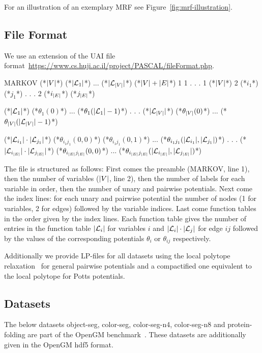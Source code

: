 For an illustration of an exemplary MRF see Figure~\ref{fig:mrf-illustration}.

\subsection{File Format}
\label{sec:mrf-file-format}
We use an extension of the UAI file format~\url{https://www.cs.huji.ac.il/project/PASCAL/fileFormat.php}.

{
\small
\begin{fileformat}
MARKOV
(*$\lvert V\rvert$*)
(*$\lvert\mathcal{L}_1\rvert$*) ... (*$\lvert\mathcal{L}_{\lvert V\rvert}\rvert$*) 
(*$\lvert V\rvert + \lvert E\rvert$*)
1 1
.
.
.
1 (*$\lvert V\rvert$*) 
2 (*$i_1$*) (*$j_1$*) 
.
.
.
2 (*$i_{\lvert E\rvert}$*) (*$j_{\lvert E\rvert}$*) 

(*$\lvert\mathcal{L}_1\rvert$*) 
(*$\theta_1(0)$*) ... (*$\theta_1(\lvert\mathcal{L}_1\rvert-1)$*)
.
.
.
(*$\lvert\mathcal{L}_{\lvert V\rvert}\rvert$*)
(*$\theta_{\lvert V\rvert}(0)$*) ... (*$\theta_{\lvert V\rvert}(\lvert\mathcal{L}_{\lvert V\rvert}\rvert-1)$*)

(*$\lvert\mathcal{L}_{i_1}\rvert \cdot \lvert\mathcal{L}_{j_1}\rvert $*) 
(*$\theta_{i_1 j_1}(0,0)$*) (*$\theta_{i_1 j_1}(0,1)$*) ... (*$\theta_{i_1 j_1}(\lvert\mathcal{L}_{i_1}\rvert, \lvert\mathcal{L}_{j_1}\rvert)$*)
.
.
.
(*$\lvert\mathcal{L}_{i_{\lvert E\rvert}}\rvert \cdot \lvert\mathcal{L}_{j_{\lvert E\rvert}}\rvert $*) 
(*$\theta_{i_{\lvert E\rvert} j_{\lvert E\rvert}}(0,0)$*) ... (*$\theta_{i_{\lvert E\rvert} j_{\lvert E\rvert}}(\lvert\mathcal{L}_{i_{\lvert E\rvert}}\rvert, \lvert\mathcal{L}_{j_{\lvert E\rvert}}\rvert)$*)
\end{fileformat}
}
The file is structured as follows:
First comes the preamble (MARKOV, line 1),
then the number of variables ($\lvert V\rvert$, line 2),
then the number of labels for each variable in order,
then the number of unary and pairwise potentials.
Next come the index lines:
for each unary and pairwise potential the number of nodes (1 for variables, 2 for edges) followed by the variable indices.
Last come function tables in the order given by the index lines.
Each function table gives the number of entries in the function table $\lvert\mathcal{L}_i\rvert$ for variables $i$ and $\lvert\mathcal{L}_i\rvert \cdot \lvert\mathcal{L}_j\rvert$ for edge $ij$ followed by the values of the corresponding potentials $\theta_i$ or $\theta_{ij}$ respectively.

Additionally we provide LP-files for all datasets using the local polytope relaxation~\cite{werner2007linear} for general pairwise potentials and a compactified one equivalent to the local polytope for Potts potentials.

\subsection{Datasets}
The below datasets object-seg, color-seg, color-seg-n4, color-seg-n8 and protein-folding are part of the OpenGM benchmark~\cite{kappes2015comparative}.
These datasets are additionally given in the OpenGM hdf5 format.

